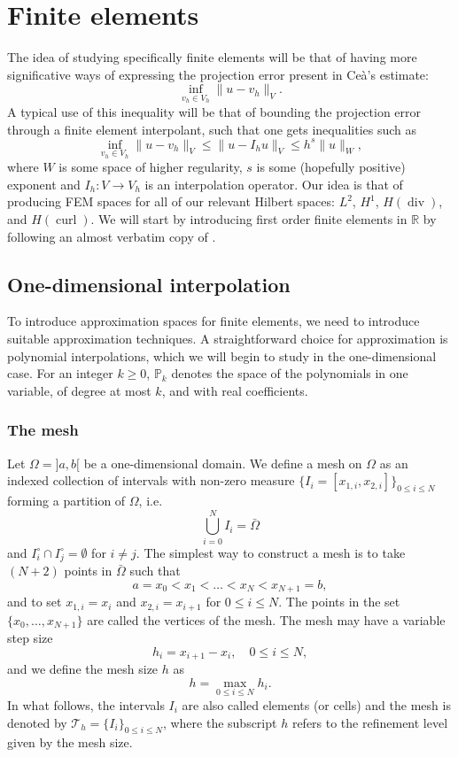 \documentclass{article}
\DeclareMathOperator{\dive}{\text{div}}
\DeclareMathOperator{\curl}{\text{curl}}
\newcommand{\R}{\mathbb{R}}
\begin{document}
\section{Finite elements}\label{sec:fem}
The idea of studying specifically finite elements will be that of having more significative ways of expressing the projection error present in Ceà's estimate: 
    $$ \inf_{v_h\in V_h} \| u - v_h\|_V. $$
A typical use of this inequality will be that of bounding the projection error through a finite element interpolant, such that one gets inequalities such as
    $$ \inf_{v_h\in V_h} \| u - v_h\|_V \leq \| u - I_h u \|_V \leq h^s \|u \|_W, $$
    where $W$ is some space of higher regularity, $s$ is some (hopefully positive) exponent and $I_h:V \to V_h$ is an interpolation operator. Our idea is that of producing FEM spaces for all of our relevant Hilbert spaces: $L^2$, $H^1$, $H(\dive)$, and $H(\curl)$. We will start by introducing first order finite elements in $\R$ by following an almost verbatim copy of \cite[Chapter 1]{ern2004theory}. 

\subsection{One-dimensional interpolation} 

To introduce approximation spaces for finite elements, we need to introduce suitable approximation techniques. A straightforward choice for approximation is polynomial interpolations, which we will begin to study in the one-dimensional case. For an integer $k \ge 0$, $\mathbb{P}_k$ denotes the space of the polynomials in one variable, of degree at most $k$, and with real coefficients.

\subsubsection{The mesh}
Let $\Omega = ]a, b[$ be a one-dimensional domain. We define a mesh on $\Omega$ as an indexed collection of intervals with non-zero measure $\{I_i = [x_{1,i}, x_{2,i}]\}_{0 \leq i \leq N}$ forming a partition of $\Omega$, i.e.
$$ \bigcup_{i=0}^N I_i = \bar{\Omega} $$
and $I_i^\circ \cap I_j^\circ = \emptyset$ for $i \neq j$.
The simplest way to construct a mesh is to take $(N+2)$ points in $\bar{\Omega}$ such that
$$ a = x_0 < x_1 < \dots < x_N < x_{N+1} = b, $$
and to set $x_{1,i} = x_i$ and $x_{2,i} = x_{i+1}$ for $0 \le i \le N$. The points in the set $\{x_0, \dots, x_{N+1}\}$ are called the vertices of the mesh. The mesh may have a variable step size
$$ h_i = x_{i+1} - x_i, \quad 0 \leq i \le N, $$
and we define the mesh size $h$ as
$$ h = \max_{0 \le i \le N} h_i.$$
In what follows, the intervals $I_i$ are also called elements (or cells) and the mesh is denoted by $\mathcal{T}_h = \{I_i\}_{0 \le i \le N}$, where the subscript $h$ refers to the refinement level given by the mesh size.
\end{document}

